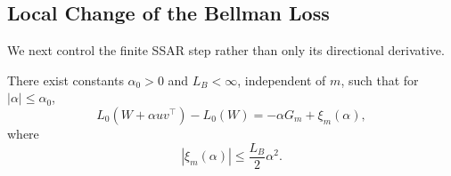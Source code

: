 \subsection{Local Change of the Bellman Loss}

We next control the finite SSAR step rather than only its directional
derivative.

\begin{lemma}
\label{lem:bellman_expansion}
There exist constants $\alpha_0>0$ and $L_B<\infty$, independent of $m$,
such that for $|\alpha|\leq\alpha_0$,
\begin{equation}
L_0(W+\alpha uv^\top)-L_0(W)
=
-\alpha G_m+\xi_m(\alpha),
\label{eq:bellman_expansion}
\end{equation}
where
\begin{equation}
|\xi_m(\alpha)|
\leq
\frac{L_B}{2}\alpha^2.
\label{eq:remainder_bound}
\end{equation}
\end{lemma}

